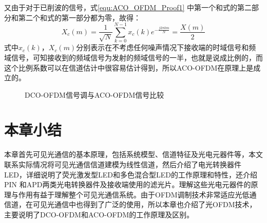 又由于对于已削波的信号，式\ref{equ:ACO_OFDM_Proof1} 中第一个和式的第二部分和第二个和式的第一部分都为零，故得：
\begin{equation}
X_{c}(m)=\frac{1}{\sqrt{N}}\sum \limits_{k=0}^{N-1}x_{c}(k)e^{-\frac{j2\pi km}{N}}=\frac{X(m)}{2}
\label{equ:ACO_OFDM_Proof3}
\end{equation}
式中$x_c(k)$，$X_c(m)$分别表示在不考虑任何噪声情况下接收端的时域信号和频域信号，可知接收到的频域信号为发射的频域信号的一半，也就是说成比例的，而这个比例系数可以在信道估计中很容易估计得到，所以ACO-OFDM在原理上是成立的。

\begin{figure}[h]
    \centering
    \caption{DCO-OFDM信号调与ACO-OFDM信号比较}
    \label{fig:DCO-OFDMVSACO-OFDM}
\end{figure}
\section{本章小结}
本章首先可见光通信的基本原理，包括系统模型、信道特征及光电元器件等，本文联系实际情况将可见光通信信道建模为线性信道，然后介绍了电光转换器件LED，详细说明了荧光激发型LED和多色混合型LED的工作原理和特性，还介绍PIN 和APD两类光电转换器件及接收端使用的滤光片。理解这些光电元器件的原理与作用有益于理解整个可见光通信系统。由于OFDM调制技术非常适应光低通信道，在可见光通信中也得到了广泛的使用，所以本章也介绍了光OFDM技术，主要说明了DCO-OFDM和ACO-OFDM的工作原理及区别。
